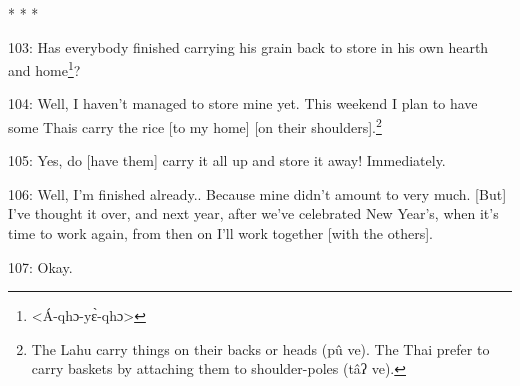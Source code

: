 \begin{center}
* * *
\end{center}

\leftskip=0pt
103: Has everybody finished carrying his grain back to store in his own hearth
and home\footnote{<Á-qhɔ-yɛ̀-qhɔ>}?

104: Well, I haven't managed to store mine yet. This weekend I plan to have some
Thais carry the rice [to my home] [on their shoulders].\footnote{The Lahu carry things on their backs or heads (pû ve). The Thai prefer to carry baskets by attaching them to shoulder-poles (tâʔ ve).}

105: Yes, do [have them] carry it all up and store it away! Immediately.

106: Well, I'm finished already.. Because mine didn't amount to very much. [But]
I've thought it over, and next year, after we've celebrated New Year's, when it's
time to work again, from then on I'll work together [with the others].

107: Okay.

